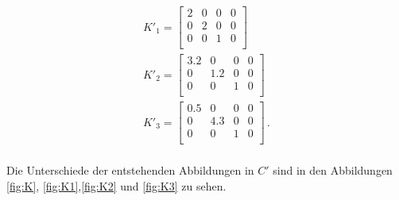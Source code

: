 \begin{gather}
	K'_1 = \begin{bmatrix}
		2&0&0&0\\
		0&2&0&0\\
		0&0&1&0\\
	\end{bmatrix}\\
	K'_2 = \begin{bmatrix}
		3.2&0&0&0\\
		0&1.2&0&0\\
		0&0&1&0\\
	\end{bmatrix}\\
	K'_3 = \begin{bmatrix}
		0.5&0&0&0\\
		0&4.3&0&0\\
		0&0&1&0\\
	\end{bmatrix} \, .
\end{gather}\\

Die Unterschiede der entstehenden Abbildungen in $C'$ sind in den Abbildungen \ref{fig:K}, \ref{fig:K1},\ref{fig:K2} und \ref{fig:K3} zu sehen.  \\
 
